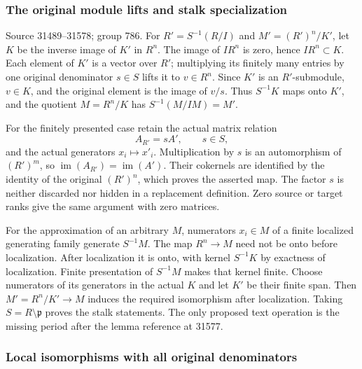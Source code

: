 \subsubsection{The original module lifts and stalk specialization}\label{algebra-proof-035-the-original-module-lifts-and-stalk-specialization}

Source 31489--31578; group 786. For \(R'=S^{-1}(R/I)\) and \(M'=(R')^n/K'\), let \(K\) be the inverse image of \(K'\) in \(R^n\). The image of \(I R^n\) is zero, hence \(IR^n\subset K\). Each element of \(K'\) is a vector over \(R'\); multiplying its finitely many entries by one original denominator \(s\in S\) lifts it to \(v\in R^n\). Since \(K'\) is an \(R'\)-submodule, \(v\in K\), and the original element is the image of \(v/s\). Thus \(S^{-1}K\) maps onto \(K'\), and the quotient \(M=R^n/K\) has \(S^{-1}(M/IM)=M'\).

For the finitely presented case retain the actual matrix relation \[
A_{R'}=sA',\qquad s\in S,
\] and the actual generators \(x_i\mapsto x'_i\). Multiplication by \(s\) is an automorphism of \((R')^m\), so \(\operatorname{im}(A_{R'})=\operatorname{im}(A')\). Their cokernels are identified by the identity of the original \((R')^n\), which proves the asserted map. The factor \(s\) is neither discarded nor hidden in a replacement definition. Zero source or target ranks give the same argument with zero matrices.

For the approximation of an arbitrary \(M\), numerators \(x_i\in M\) of a finite localized generating family generate \(S^{-1}M\). The map \(R^n\to M\) need not be onto before localization. After localization it is onto, with kernel \(S^{-1}K\) by exactness of localization. Finite presentation of \(S^{-1}M\) makes that kernel finite. Choose numerators of its generators in the actual \(K\) and let \(K'\) be their finite span. Then \(M'=R^n/K'\to M\) induces the required isomorphism after localization. Taking \(S=R\setminus\mathfrak p\) proves the stalk statements. The only proposed text operation is the missing period after the lemma reference at 31577.

\subsubsection{Local isomorphisms with all original denominators}\label{algebra-proof-035-local-isomorphisms-with-all-original-denominators}

